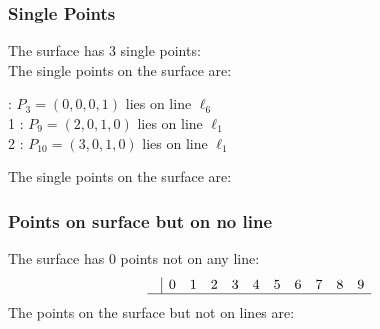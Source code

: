 \documentclass{article}
\begin{document}
{\subsubsection*{Single Points}
The surface has 3 single points:\\
The single points on the surface are:\\
\begin{multicols}{2}
 : $P_{3}=( 0, 0, 0, 1 )$ lies on line $\ell_{6}$\\
1 : $P_{9}=( 2, 0, 1, 0 )$ lies on line $\ell_{1}$\\
2 : $P_{10}=( 3, 0, 1, 0 )$ lies on line $\ell_{1}$\\
\end{multicols}
The single points on the surface are:\\
\subsubsection*{Points on surface but on no line}
The surface has 0 points not on any line:\\
$$
\begin{array}{r|*{10}{r}}
 & 0 & 1 & 2 & 3 & 4 & 5 & 6 & 7 & 8 & 9\\
\hline
\end{array}
$$
The points on the surface but not on lines are:\\
\begin{multicols}{2}
\noindent
\end{multicols}
}
\end{document}
